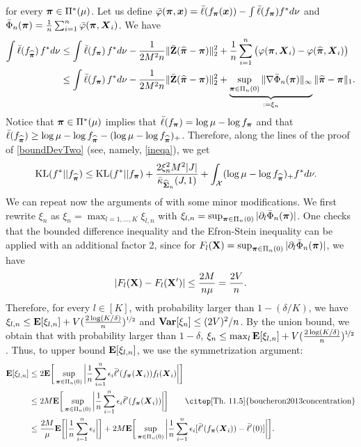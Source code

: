 for every $\boldsymbol \pi\in\Pi^*(\mu)$. Let us define $\bar \varphi(\boldsymbol \pi,\boldsymbol x) = \bar\ell(f_{\boldsymbol \pi}(\boldsymbol x))-
\int \bar\ell(f_{\boldsymbol \pi})f^*d\nu$ and $\bar\Phi_n(\boldsymbol \pi) = \frac1n\sum_{i=1}^n
\bar\varphi(\boldsymbol \pi,\boldsymbol X_i)$. We have
\begin{align}
\int \bar\ell(f_{\widehat{\boldsymbol \pi}})\,f^*d\nu
&\leq \int \bar\ell(f_{\boldsymbol \pi})\,f^*d\nu-\frac{1}{2M^2n}\|\bar{\mathbf Z}(\widehat{\boldsymbol \pi}-\boldsymbol \pi)\|_2^2
+ \frac1n\sum_{i=1}^n \big(\varphi(\boldsymbol \pi,\boldsymbol X_i)-\varphi(\widehat{\boldsymbol \pi},\boldsymbol X_i)\big)\label{tempOraclIneqb}\\
&\leq \int \bar\ell(f_{\boldsymbol \pi})\,f^*d\nu-\frac{1}{2M^2n}\|\bar{\mathbf Z}(\widehat{\boldsymbol \pi}-\boldsymbol \pi)\|_2^2
+\underbrace{\sup_{\boldsymbol \pi\in \Pi_n(0)}\|\nabla\bar\Phi_n(\boldsymbol \pi)\|_\infty}_{:=\xi_n} \|\widehat{\boldsymbol \pi}-\boldsymbol \pi \|_1.
\end{align}
Notice that $\boldsymbol \pi\in\Pi^*(\mu)$ implies that $\bar\ell(f_{\boldsymbol \pi}) = \log\mu-\log f_{\boldsymbol \pi}$
and that $\bar\ell(f_{\widehat{\boldsymbol \pi}}) \ge  \log \mu-\log f_{\widehat{\boldsymbol \pi}} -(\log\mu-\log f_{\widehat{\boldsymbol \pi}})_+ $.
Therefore, along the lines of the proof of \eqref{boundDevTwo} (see, namely, \eqref{ineqa}),
we get
\begin{align}
\label{tempOraclIneqC}
{\rm KL}(f^*||f_{\widehat{\boldsymbol \pi}})
&\leq {\rm KL}(f^*||f_{\boldsymbol \pi}) + \frac{2\xi_n^2M^2|J|}{\bar\kappa_{\widehat{\boldsymbol\Sigma}_n}(J,1)}
+\int_{\mathcal X}(\log\mu-\log f_{\widehat{\boldsymbol \pi}})_+f^*d\nu.
\end{align}
We can repeat now the arguments of  with some minor modifications. We first
rewrite $\xi_n$ as $\xi_n = \max_{l=1,\ldots,K} \xi_{l,n}$ with $\xi_{l,n} = \sup_{\boldsymbol \pi\in\Pi_n(0)}
|\partial_l \bar\Phi_n(\boldsymbol \pi)|$. One checks that the bounded difference inequality and the Efron-Stein
inequality can be applied with an additional factor 2, since for $F_l(\mathbf X) = \sup_{\boldsymbol \pi\in\Pi_n(0)}
|\partial_l \bar\Phi_n(\boldsymbol \pi)|$, we have
\begin{equation}
|F_l(\mathbf X)-F_l(\mathbf X')| \le \frac{2M}{n\mu} = \frac{2V}{n}.
\end{equation}
Therefore, for every $l\in[K]$, with probability larger than $1-(\delta/K)$, we have $\xi_{l,n}\le
\mathbf E[\xi_{l,n}]+ V(\frac{2\log(K/\delta)}{n})^{\nicefrac12}$ and ${\bf Var}[\xi_n]\le (2V)^2/n$.
By the union bound, we obtain that with probability larger than $1-\delta$,
$\xi_{n}\le \max_l\mathbf E[\xi_{l,n}]+ V(\frac{2\log(K/\delta)}{n})^{\nicefrac12}$. Thus, to upper
bound $\mathbf E[\xi_{l,n}]$, we use the symmetrization argument:
\begin{align}
\Ex[\xi_{l,n}]
& \le 2\Ex\bigg[\sup_{\bpi\in\Pi_n(0)} \bigg|\frac1n\sum_{i=1}^n \epsilon_i
\bar\ell'(f_{\bpi}(\bX_i))f_l(\bX_i)\bigg|\bigg]\\
&\le 2M\Ex\bigg[\sup_{\bpi\in\Pi_n(0)} \bigg|\frac1n\sum_{i=1}^n \epsilon_i
\bar\ell'(f_{\bpi}(\bX_i))\bigg|\bigg]\qquad\text{\citep[Th.\ 11.5]{boucheron2013concentration}}\\
&\le \frac{2M}{\mu}\Ex\bigg[\bigg|\frac1n\sum_{i=1}^n \epsilon_i\bigg|\bigg]+
2M\Ex\bigg[\sup_{\bpi\in\Pi_n(0)} \bigg|\frac1n\sum_{i=1}^n \epsilon_i
[\bar\ell'(f_{\bpi}(\bX_i))-\bar\ell'(0)]\bigg|\bigg].
\end{align}

